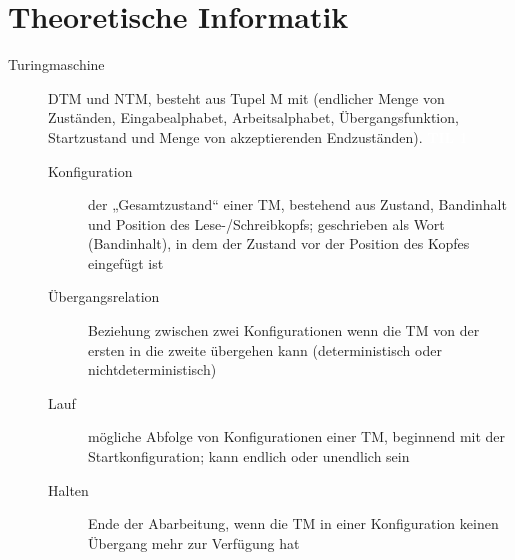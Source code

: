 \documentclass[a4paper,10pt]{article}
\newcommand{\vl}[1]{\colorbox{light-gray}{\textcolor{white}{\textbf{#1}}}}
\begin{document}
    \newpage
    \section{Theoretische Informatik}
    \begin{description}
        \item[Turingmaschine] DTM und NTM, besteht aus Tupel M mit (endlicher Menge von Zuständen, Eingabealphabet, Arbeitsalphabet, Übergangsfunktion, Startzustand und Menge von akzeptierenden Endzuständen). \vl{TIL 1}
            \begin{description}
                \item[Konfiguration]
                    der „Gesamtzustand“ einer TM, bestehend aus Zustand, Bandinhalt und Position des Lese-/Schreibkopfs;
                    geschrieben als Wort (Bandinhalt), in dem der Zustand vor der Position des Kopfes eingefügt ist
                \item[Übergangsrelation]
                    Beziehung zwischen zwei Konfigurationen wenn die TM von der ersten in die zweite übergehen kann
                    (deterministisch oder nichtdeterministisch)
                \item[Lauf]
                    mögliche Abfolge von Konfigurationen einer TM, beginnend mit der Startkonfiguration; kann endlich oder unendlich sein
                \item[Halten]
                    Ende der Abarbeitung, wenn die TM in einer Konfiguration keinen Übergang mehr zur Verfügung hat
            \end{description}
    \end{description}
\end{document}
